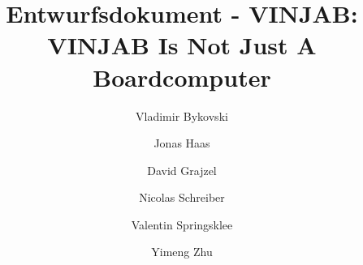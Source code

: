 \documentclass[a4paper]{scrreprt}
\begin{document}
\title{Entwurfsdokument - VINJAB: VINJAB Is Not Just A Boardcomputer}
\author{Vladimir Bykovski 
			\and Jonas Haas 
			\and David Grajzel 
			\and Nicolas Schreiber
			\and Valentin Springsklee
			\and Yimeng Zhu}


\maketitle

\newpage
\setcounter{page}{1} %


\tableofcontents

\newpage
{}




\end{document}
